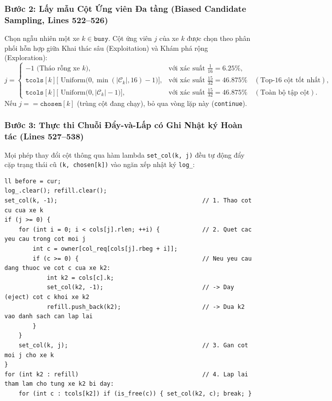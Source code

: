 \documentclass[11pt,a4paper]{article}
\theoremstyle{definition}
\begin{document}
\subsubsection{Bước 2: Lấy mẫu Cột Ứng viên Đa tầng (Biased Candidate Sampling, Lines 522--526)}
Chọn ngẫu nhiên một xe $k \in \texttt{busy}$. Cột ứng viên $j$ của xe $k$ được chọn theo phân phối hỗn hợp giữa Khai thác sâu (Exploitation) và Khám phá rộng (Exploration):
\begin{equation}
    j = \begin{cases}
    -1 \text{ (Tháo rỗng xe } k\text{)}, & \text{với xác suất } \frac{1}{16} = 6.25\%,\\[0.2cm]
    \texttt{tcols}[k]\big[\text{ Uniform}\big(0, \min(|\mathcal{C}_k|, 16) - 1\big)\big], & \text{với xác suất } \frac{15}{32} = 46.875\% \quad (\text{Top-16 cột tốt nhất}),\\[0.2cm]
    \texttt{tcols}[k]\big[\text{ Uniform}\big(0, |\mathcal{C}_k| - 1\big)\big], & \text{với xác suất } \frac{15}{32} = 46.875\% \quad (\text{Toàn bộ tập cột}).
    \end{cases}
\end{equation}
Nếu $j == \texttt{chosen}[k]$ (trùng cột đang chạy), bỏ qua vòng lặp này (\texttt{continue}).

\subsubsection{Bước 3: Thực thi Chuỗi Đẩy-và-Lấp có Ghi Nhật ký Hoàn tác (Lines 527--538)}
Mọi phép thay đổi cột thông qua hàm lambda \texttt{set\_col(k, j)} đều tự động đẩy cặp trạng thái cũ \texttt{(k, chosen[k])} vào ngăn xếp nhật ký \texttt{log\_}:
\begin{lstlisting}
ll before = cur;
log_.clear(); refill.clear();
set_col(k, -1);                                         // 1. Thao cot cu cua xe k
if (j >= 0) {
    for (int i = 0; i < cols[j].rlen; ++i) {            // 2. Quet cac yeu cau trong cot moi j
        int c = owner[col_req[cols[j].rbeg + i]];
        if (c >= 0) {                                   // Neu yeu cau dang thuoc ve cot c cua xe k2:
            int k2 = cols[c].k;
            set_col(k2, -1);                            // -> Day (eject) cot c khoi xe k2
            refill.push_back(k2);                       // -> Dua k2 vao danh sach can lap lai
        }
    }
    set_col(k, j);                                      // 3. Gan cot moi j cho xe k
}
for (int k2 : refill)                                   // 4. Lap lai tham lam cho tung xe k2 bi day:
    for (int c : tcols[k2]) if (is_free(c)) { set_col(k2, c); break; }
\end{lstlisting}
\end{document}
